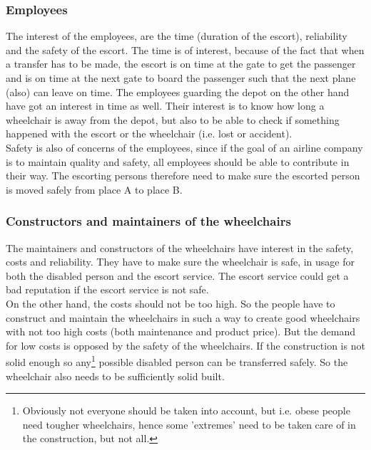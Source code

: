 \documentclass[a4paper, 12pt, notitlepage]{report}
\begin{document}
\subsubsection{Employees}
The interest of the employees, are the time (duration of the escort), reliability and the safety of the escort. The time is of interest, because of the fact that when a transfer has to be made, the escort is on time at the gate to get the passenger and is on time at the next gate to board the passenger such that the next plane (also) can leave on time. The employees guarding the depot on the other hand have got an interest in time as well. Their interest is to know how long a wheelchair is away from the depot, but also to be able to check if something happened with the escort or the wheelchair (i.e. lost or accident). \\
Safety is also of concerns of the employees, since if the goal of an airline company is to maintain quality and safety, all employees should be able to contribute in their way. The escorting persons therefore need to make sure the escorted person is moved safely from place A to place B.
\subsubsection{Constructors and maintainers of the wheelchairs}
The maintainers and constructors of the wheelchairs have interest in the safety, costs and reliability. They have to make sure the wheelchair is safe,  in usage for both the disabled person and the escort service. The escort service could get a bad reputation if the escort service is not safe.\\
On the other hand, the costs should not be too high. So the people have to construct and maintain the wheelchairs in such a way to create good wheelchairs with not too high costs (both maintenance and product price). But the demand for low costs is opposed by the safety of the wheelchairs. If the construction is not solid enough so any\footnote{Obviously not everyone should be taken into account, but i.e. obese people need tougher wheelchairs, hence some 'extremes' need to be taken care of in the construction, but not all.} possible disabled person can be transferred safely. So the wheelchair also needs to be sufficiently solid built.
\end{document}
